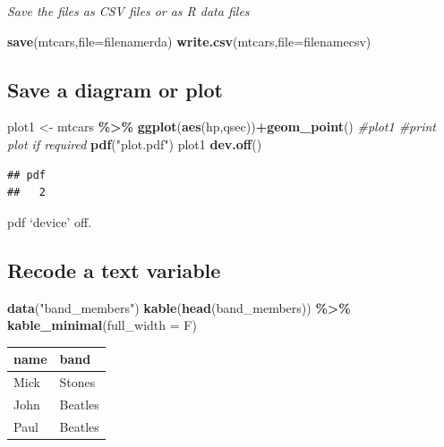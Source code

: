 \documentclass[
]{article}
\newenvironment{Shaded}{\begin{snugshade}}{\end{snugshade}}
\newcommand{\AttributeTok}[1]{\textcolor[rgb]{0.13,0.29,0.53}{#1}}
\newcommand{\CommentTok}[1]{\textcolor[rgb]{0.56,0.35,0.01}{\textit{#1}}}
\newcommand{\FunctionTok}[1]{\textcolor[rgb]{0.13,0.29,0.53}{\textbf{#1}}}
\newcommand{\NormalTok}[1]{#1}
\newcommand{\OtherTok}[1]{\textcolor[rgb]{0.56,0.35,0.01}{#1}}
\newcommand{\SpecialCharTok}[1]{\textcolor[rgb]{0.81,0.36,0.00}{\textbf{#1}}}
\newcommand{\StringTok}[1]{\textcolor[rgb]{0.31,0.60,0.02}{#1}}
\begin{document}
\emph{Save the files as CSV files or as R data files}

\begin{Shaded}
\begin{Highlighting}[]
\FunctionTok{save}\NormalTok{(mtcars,}\AttributeTok{file=}\NormalTok{filenamerda)}
\FunctionTok{write.csv}\NormalTok{(mtcars,}\AttributeTok{file=}\NormalTok{filenamecsv)}
\end{Highlighting}
\end{Shaded}

\hypertarget{save-a-diagram-or-plot}{%
\subsection{Save a diagram or plot}\label{save-a-diagram-or-plot}}

\begin{Shaded}
\begin{Highlighting}[]
\NormalTok{plot1 }\OtherTok{\textless{}{-}}\NormalTok{ mtcars }\SpecialCharTok{\%\textgreater{}\%} \FunctionTok{ggplot}\NormalTok{(}\FunctionTok{aes}\NormalTok{(hp,qsec))}\SpecialCharTok{+}\FunctionTok{geom\_point}\NormalTok{()}
\CommentTok{\#plot1 \#print plot if required}
\FunctionTok{pdf}\NormalTok{(}\StringTok{"plot.pdf"}\NormalTok{)}
\NormalTok{plot1}
\FunctionTok{dev.off}\NormalTok{()}
\end{Highlighting}
\end{Shaded}

\begin{verbatim}
## pdf 
##   2
\end{verbatim}

pdf `device' off.

\hypertarget{recode-a-text-variable}{%
\subsection{Recode a text variable}\label{recode-a-text-variable}}

\begin{Shaded}
\begin{Highlighting}[]
\FunctionTok{data}\NormalTok{(}\StringTok{"band\_members"}\NormalTok{)}
\FunctionTok{kable}\NormalTok{(}\FunctionTok{head}\NormalTok{(band\_members)) }\SpecialCharTok{\%\textgreater{}\%} \FunctionTok{kable\_minimal}\NormalTok{(}\AttributeTok{full\_width =}\NormalTok{ F)}
\end{Highlighting}
\end{Shaded}

\begin{table}
\centering
\begin{tabular}{l|l}
\hline
name & band\\
\hline
Mick & Stones\\
\hline
John & Beatles\\
\hline
Paul & Beatles\\
\hline
\end{tabular}
\end{table}
\end{document}
